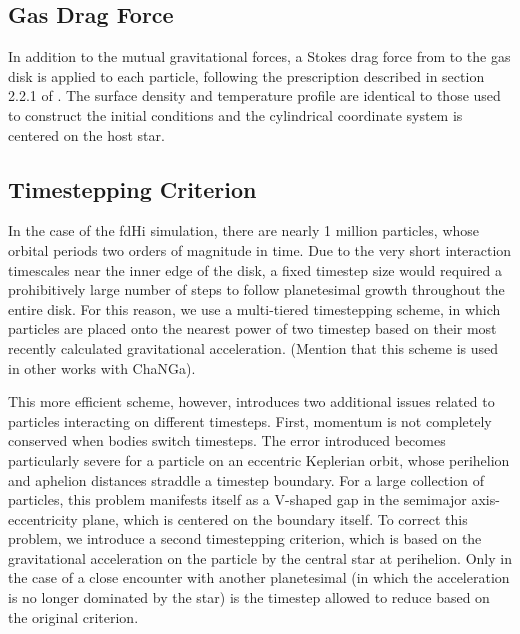 \documentclass[twocolumn]{aastex63}
\begin{document}
\subsection{Gas Drag Force}

In addition to the mutual gravitational forces, a Stokes drag force from to the gas disk is applied to each particle, following the prescription described in section 2.2.1 of \citet{morishima10}. The surface density and temperature profile are identical to those used to construct the initial conditions and the cylindrical coordinate system is centered on the host star.

\subsection{Timestepping Criterion}

In the case of the fdHi simulation, there are nearly 1 million particles, whose orbital periods two orders of magnitude in time. Due to the very short interaction timescales near the inner edge of the disk, a fixed timestep size would required a prohibitively large number of steps to follow planetesimal growth throughout the entire disk. For this reason, we use a multi-tiered timestepping scheme, in which particles are placed onto the nearest power of two timestep based on their most recently calculated gravitational acceleration. (Mention that this scheme is used in other works with ChaNGa).

This more efficient scheme, however, introduces two additional issues related to particles interacting on different timesteps. First, momentum is not completely conserved when bodies switch timesteps. The error introduced becomes particularly severe for a particle on an eccentric Keplerian orbit, whose perihelion and aphelion distances straddle a timestep boundary. For a large collection of particles, this problem manifests itself as a V-shaped gap in the semimajor axis-eccentricity plane, which is centered on the boundary itself. To correct this problem, we introduce a second timestepping criterion, which is based on the gravitational acceleration on the particle by the central star at perihelion. Only in the case of a close encounter with another planetesimal (in which the acceleration is no longer dominated by the star) is the timestep allowed to reduce based on the original criterion.
\end{document}
